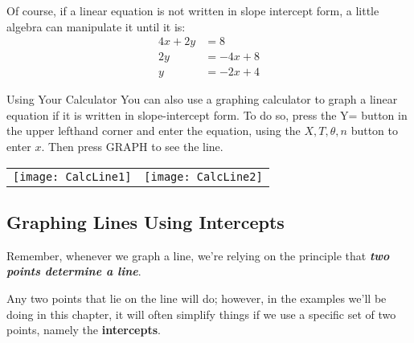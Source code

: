 Of course, if a linear equation is not written in slope intercept form, a little algebra can manipulate it until it is:
\begin{align*}
4x+2y &= 8\\
2y &= -4x +8\\
y &= -2x+4
\end{align*}

\begin{proc}{Using Your Calculator}
You can also use a graphing calculator to graph a linear equation if it is written in slope-intercept form.  To do so, press the Y= button in the upper lefthand corner and enter the equation, using the $X,T,\theta,n$ button to enter $x$.  Then press GRAPH to see the line.
\begin{center}
\begin{tabular}{c c}
\texttt{[image: CalcLine1]} & \hspace{0.5in} \texttt{[image: CalcLine2]}
\end{tabular}
\end{center}
\end{proc}

\subsection{Graphing Lines Using Intercepts}
Remember, whenever we graph a line, we're relying on the principle that \textbf{\emph{two points determine a line}}.

Any two points that lie on the line will do; however, in the examples we'll be doing in this chapter, it will often simplify things if we use a specific set of two points, namely the \textbf{intercepts}.


